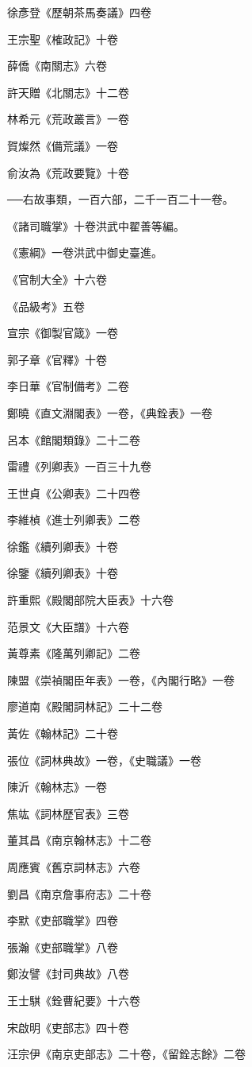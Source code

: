 徐彥登《歷朝茶馬奏議》四卷

王宗聖《榷政記》十卷

薛僑《南關志》六卷

許天贈《北關志》十二卷

林希元《荒政叢言》一卷

賀燦然《備荒議》一卷

俞汝為《荒政要覽》十卷

──右故事類，一百六部，二千一百二十一卷。

《諸司職掌》十卷洪武中翟善等編。

《憲綱》一卷洪武中御史臺進。

《官制大全》十六卷

《品級考》五卷

宣宗《御製官箴》一卷

郭子章《官釋》十卷

李日華《官制備考》二卷

鄭曉《直文淵閣表》一卷，《典銓表》一卷

呂本《館閣類錄》二十二卷

雷禮《列卿表》一百三十九卷

王世貞《公卿表》二十四卷

李維楨《進士列卿表》二卷

徐鑑《續列卿表》十卷

徐鑒《續列卿表》十卷

許重熙《殿閣部院大臣表》十六卷

范景文《大臣譜》十六卷

黃尊素《隆萬列卿記》二卷

陳盟《崇禎閣臣年表》一卷，《內閣行略》一卷

廖道南《殿閣詞林記》二十二卷

黃佐《翰林記》二十卷

張位《詞林典故》一卷，《史職議》一卷

陳沂《翰林志》一卷

焦竑《詞林歷官表》三卷

董其昌《南京翰林志》十二卷

周應賓《舊京詞林志》六卷

劉昌《南京詹事府志》二十卷

李默《吏部職掌》四卷

張瀚《吏部職掌》八卷

鄭汝譬《封司典故》八卷

王士騏《銓曹紀要》十六卷

宋啟明《吏部志》四十卷

汪宗伊《南京吏部志》二十卷，《留銓志餘》二卷

